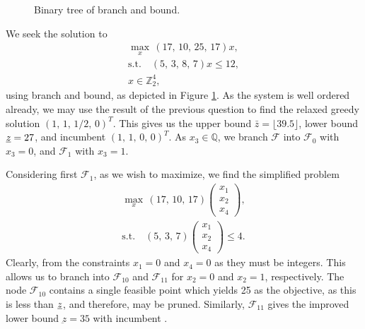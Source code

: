 \documentclass[11pt,a4paper]{article}
\begin{document}
\begin{enumerate}[i)]
\begin{figure}[tbp]
		\caption{Binary tree of branch and bound.}
		\label{fig:bnb}
	\end{figure}
	We seek the solution to
	\begin{gather*}
		\max_x \, (17, \, 10, \, 25, \, 17) x, \\
		\text{s.t.} \quad (5, \, 3, \, 8, \, 7) x \leq 12, \\
		x \in \mathbb{Z}_2^4,
	\end{gather*}
	using branch and bound, as depicted in Figure \ref{fig:bnb}. As the system is well ordered already, we may use the result of the previous question to find the relaxed greedy solution $(1, \, 1, \, 1/2, \, 0)^T$. This gives us the upper bound $\bar{z} = \lfloor 39.5 \rfloor$, lower bound $\underbar{$z$} = 27$, and incumbent $(1, \, 1, \, 0, \, 0)^T$. As $x_3 \in \mathbb{Q}$, we branch $\mathcal{F}$ into $\mathcal{F}_0$ with $x_3 = 0$, and $\mathcal{F}_1$ with $x_3 = 1$.

	Considering first $\mathcal{F}_1$, as we wish to maximize, we find the simplified problem
	\begin{gather*}
		\max_x \, (17, \, 10, \, 17)
		\begin{pmatrix}
			x_1 \\
			x_2 \\
			x_4
		\end{pmatrix}, \\
		\text{s.t.} \quad (5, \, 3, \, 7)
		\begin{pmatrix}
			x_1 \\
			x_2 \\
			x_4
		\end{pmatrix}
		\leq 4.
	\end{gather*}
	Clearly, from the constraints $x_1 = 0$ and $x_4 = 0$ as they must be integers. This allows us to branch into $\mathcal{F}_{10}$ and $\mathcal{F}_{11}$ for $x_2 = 0$ and $x_2 = 1$, respectively. The node $\mathcal{F}_{10}$ contains a single feasible point which yields 25 as the objective, as this is less than $\underbar{$z$}$, and therefore, may be pruned. Similarly, $\mathcal{F}_{11}$ gives the improved lower bound $\underbar{z} = 35$ with incumbent .


\end{enumerate}
\end{document}
